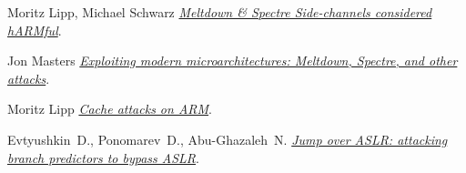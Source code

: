 \begin{frame}[allowframebreaks]
\begin{thebibliography}{10}
    Moritz Lipp, Michael Schwarz
    \newblock \href{https://mlq.me/download/qmss2018_slides.pdf}{\em Meltdown \& Spectre Side-channels considered hARMful}.

    Jon Masters
    \newblock \href{http://people.redhat.com/jcm/talks/FOSDEM_2018.pdf}{\em Exploiting modern microarchitectures: Meltdown,
      Spectre, and other attacks}.

    Moritz Lipp
    \newblock
    \href{https://www.blackhat.com/docs/eu-16/materials/eu-16-Lipp-ARMageddon-How-Your-Smartphone-CPU-Breaks-Software-Level-Security-And-Privacy-wp.pdf}{\em
      Cache attacks on ARM}.

    Evtyushkin~D., Ponomarev~D., Abu-Ghazaleh~N.
    \newblock
    \href{https://dl.acm.org/citation.cfm?id=3195638.3195686}{\em Jump over ASLR: attacking branch predictors to bypass ASLR}.

  \end{thebibliography}
\end{frame}